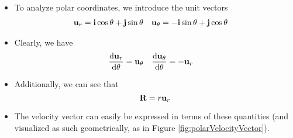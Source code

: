 \documentclass[../main.tex]{subfiles}
\begin{document}
\begin{itemize}
    \item To analyze polar coordinates, we introduce the unit vectors
    \begin{align*}
        \vb{u}_r &= \vb{i}\cos\theta+\vb{j}\sin\theta&
            \vb{u}_\theta &= -\vb{i}\sin\theta+\vb{j}\cos\theta
    \end{align*}
    \item Clearly, we have
    \begin{align*}
        \dv{\vb{u}_r}{\theta} &= \vb{u}_\theta&
            \dv{\vb{u}_\theta}{\theta} &= -\vb{u}_r
    \end{align*}
    \item Additionally, we can see that
    \begin{equation*}
        \vb{R} = r\vb{u}_r
    \end{equation*}
    \item The velocity vector can easily be expressed in terms of these quantities (and visualized as such geometrically, as in Figure \ref{fig:polarVelocityVector}).
    \begin{figure}[h!]
        \centering
\end{figure}
\end{itemize}
\end{document}
